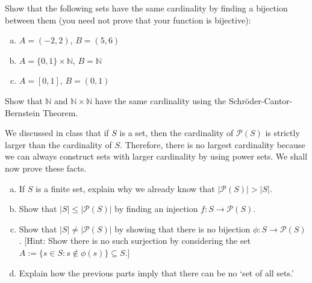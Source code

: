 \documentclass[11pt,letterpaper]{article}
\begin{document}
\homework{}

 Show that the following sets have the same cardinality by finding a bijection between them (you need not prove that your function is bijective): 
\begin{enumerate}[(a)]
\item $A= (-2, 2)$, $B= (5, 6)$
\item $A= \{ 0, 1 \} \times \mathbb{N}$, $B= \mathbb{N}$
\item $A= [0, 1]$, $B= (0, 1)$
\end{enumerate}





\newpage





 Show that $\mathbb{N}$ and $\mathbb{N} \times \mathbb{N}$ have the same cardinality using the Schr\"oder-Cantor-Bernstein Theorem.





\newpage





 We discussed in class that if $S$ is a set, then the cardinality of $\mathcal{P}(S)$ is strictly larger than the cardinality of $S$. Therefore, there is no largest cardinality because we can always construct sets with larger cardinality by using power sets. We shall now prove these facts. 
        \begin{enumerate}[(a)]
        \item If $S$ is a finite set, explain why we already know that $|\mathcal{P}(S)| > |S|$. 
        \item Show that $|S| \leq |\mathcal{P}(S)|$ by finding an injection $f: S \to \mathcal{P}(S)$. 
        \item Show that $|S| \neq |\mathcal{P}(S)|$ by showing that there is no bijection $\phi: S \to \mathcal{P}(S)$. [Hint: Show there is no such surjection by considering the set $A:= \{ s \in S \colon s \notin \phi(s) \} \subseteq S$.]
        \item Explain how the previous parts imply that there can be no `set of all sets.'        
        \end{enumerate}





\newpage
\end{document}
